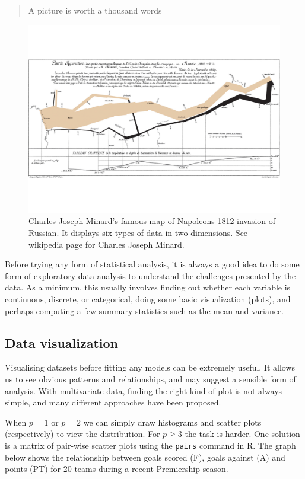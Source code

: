 \documentclass[
]{book}
\theoremstyle{definition}
\theoremstyle{definition}
\theoremstyle{definition}
\theoremstyle{definition}
\theoremstyle{remark}
\begin{document}
\begin{quote}
A picture is worth a thousand words
\end{quote}

\begin{figure}
\includegraphics[width=1\linewidth]{figs/Minard} \caption{Charles Joseph Minard's famous map of Napoleons 1812 invasion of Russian. It displays six types of data in two dimensions. See wikipedia page for Charles Joseph Minard.}\label{fig:unnamed-chunk-5}
\end{figure}

Before trying any form of statistical analysis, it is always a good idea to do some form of exploratory data analysis to understand the challenges presented by the data. As a minimum, this usually involves finding out whether each variable is continuous, discrete, or categorical, doing some basic visualization (plots), and perhaps computing a few summary statistics such as the mean and variance.

\subsection{Data visualization}\label{data-visualization}

Visualising datasets before fitting any models can be extremely useful. It allows us to see obvious patterns and relationships, and may suggest a sensible form of analysis.
With multivariate data, finding the right kind of plot is not always simple, and many different approaches have been proposed.

When \(p=1\) or \(p=2\) we can simply draw histograms and scatter plots (respectively) to view the distribution. For \(p \geq 3\) the task is harder. One solution is a matrix of pair-wise scatter plots using the \texttt{pairs} command in R. The graph below shows the relationship between goals scored (F), goals against (A) and points (PT) for 20 teams during a recent Premiership season.
\end{document}
